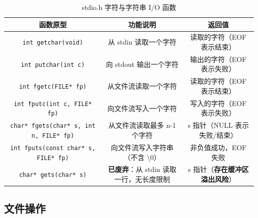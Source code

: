 \begin{table}[H]
\centering
\small
\renewcommand{\arraystretch}{1.6}
\begin{tabulary}{\linewidth}{CCC}
\toprule
\textbf{函数原型} & \textbf{功能说明} & \textbf{返回值} \\ \midrule
\texttt{int getchar(void)} & 从 stdin 读取一个字符 & 读取的字符（EOF 表示结束） \\ 
\texttt{int putchar(int c)} & 向 stdout 输出一个字符 & 输出的字符（EOF 表示失败） \\ 
\texttt{int fgetc(FILE* fp)} & 从文件流读取一个字符 & 读取的字符（EOF 表示结束） \\ 
\texttt{int fputc(int c, FILE* fp)} & 向文件流写入一个字符 & 写入的字符（EOF 表示失败） \\ 
\texttt{char* fgets(char* s, int n, FILE* fp)} & 从文件流读取最多 n-1 个字符 & s 指针（NULL 表示失败/结束） \\ 
\texttt{int fputs(const char* s, FILE* fp)} & 向文件流写入字符串（不含 \textbackslash 0） & 非负值成功，EOF 失败 \\ 
\texttt{char* gets(char* s)} & \textbf{已废弃}：从 stdin 读取一行，无长度限制 & s 指针（\textbf{存在缓冲区溢出风险}） \\ \bottomrule
\end{tabulary}
\caption{stdio.h 字符与字符串 I/O 函数}
\label{tab:stdio_char}
\end{table}

\subsection{文件操作}

